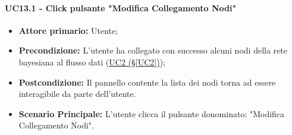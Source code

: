 \paragraph{UC13.1 - Click pulsante "Modifica Collegamento Nodi"}\label{UC13.1}
\begin{itemize}
\item \textbf{Attore primario:} Utente;
\item \textbf{Precondizione:} L'utente ha collegato con successo alcuni nodi della rete bayesiana al flusso dati 			(\hyperref[UC2]{UC2 (§\ref*{UC2})});
\item \textbf{Postcondizione:} Il pannello contente la lista dei nodi torna ad essere interagibile da parte dell'utente.
\item \textbf{Scenario Principale:} L'utente clicca il pulsante donominato: "Modifica Collegamento Nodi".
\end{itemize}
